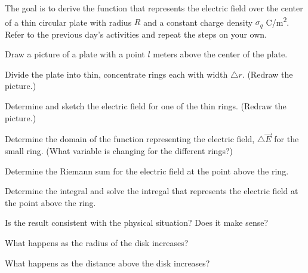 \begin{problem}
  \item The goal is to derive the function that represents the electric field over the center of
    a thin circular plate with radius $R$ and a constant charge density $\sigma_q$ C/m\textsuperscript{2}.
    Refer to the previous day's activities and repeat the steps on your own.
  \begin{subproblem}
    \item Draw a picture of a plate with a point $l$ meters above the center of the plate.
      \vfill
   \item Divide the plate into thin, concentrate rings each with width $\triangle r$.  (Redraw the picture.)
      \vfill
   \item Determine and sketch the electric field for one of the thin rings.  (Redraw the picture.)
       \vfill

    \clearpage

   \item Determine the domain of the function representing the electric field, $\triangle \vec{E}$
      for the small ring. (What variable is changing for the different rings?)
      \vspace{2em}

    \item Determine the Riemann sum for the electric field at the point above the ring.
      \vfill

    \item Determine the integral and solve the intregal that represents the electric field at the point above the ring.
      \vfill
      \vfill
      \vfill

    \clearpage

    \item Is the result consistent with the physical situation? Does it make sense?
       \vfill

     \item What happens as the radius of the disk increases?
        \vfill

      \item What happens as the distance above the disk increases?
       \vfill

  \end{subproblem}
\end{problem}

